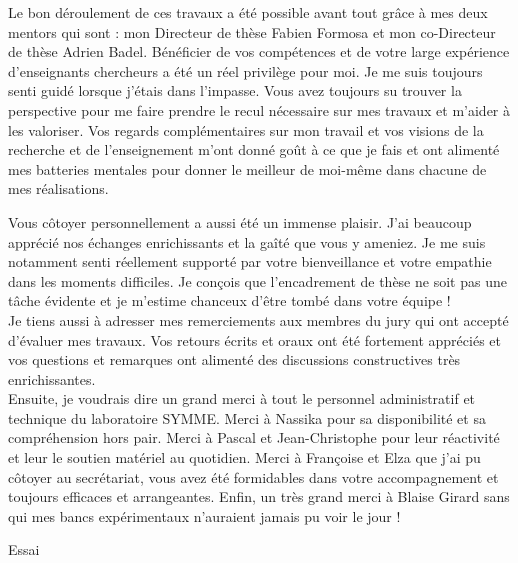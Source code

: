 Le bon déroulement de ces travaux a été possible avant tout grâce à mes deux mentors qui sont : mon Directeur de thèse Fabien Formosa et mon co-Directeur de thèse Adrien Badel. Bénéficier de vos compétences et de votre large expérience d'enseignants chercheurs a été un réel privilège pour moi. Je me suis toujours senti guidé lorsque j'étais dans l'impasse. Vous avez toujours su trouver la perspective pour me faire prendre le recul nécessaire sur mes travaux et m'aider à les valoriser. Vos regards complémentaires sur mon travail et vos visions de la recherche et de l'enseignement m'ont donné goût à ce que je fais et ont alimenté mes batteries mentales pour donner le meilleur de moi-même dans chacune de mes réalisations.

Vous côtoyer personnellement a aussi été un immense plaisir. J'ai beaucoup apprécié nos échanges enrichissants et la gaîté que vous y ameniez. Je me suis notamment senti réellement supporté par votre bienveillance et votre empathie dans les moments difficiles. Je conçois que l'encadrement de thèse ne soit pas une tâche évidente et je m'estime chanceux d'être tombé dans votre équipe !\\

Je tiens aussi à adresser mes remerciements aux membres du jury qui ont accepté d'évaluer mes travaux. Vos retours écrits et oraux ont été fortement appréciés et vos questions et remarques ont alimenté des discussions constructives très enrichissantes. \\

Ensuite, je voudrais dire un grand merci à tout le personnel administratif et technique du laboratoire SYMME. Merci à Nassika pour sa disponibilité et sa compréhension hors pair. Merci à Pascal et Jean-Christophe pour leur réactivité et leur le soutien matériel au quotidien. Merci à Françoise et Elza que j'ai pu côtoyer au secrétariat, vous avez été formidables dans votre accompagnement et toujours efficaces et arrangeantes. Enfin, un très grand merci à Blaise Girard sans qui mes bancs expérimentaux n'auraient jamais pu voir le jour !

Essai
